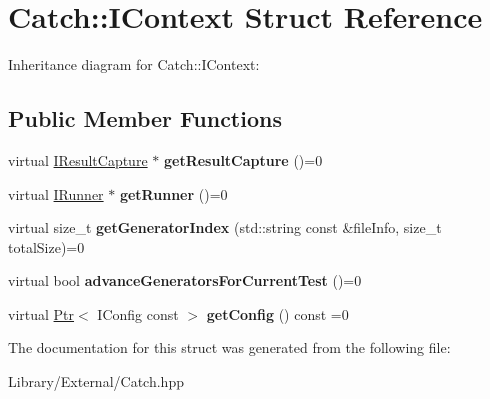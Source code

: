 \hypertarget{struct_catch_1_1_i_context}{}\section{Catch\+:\+:I\+Context Struct Reference}
\label{struct_catch_1_1_i_context}


Inheritance diagram for Catch\+:\+:I\+Context\+:
\subsection*{Public Member Functions}
\begin{DoxyCompactItemize}
\item 
\hypertarget{struct_catch_1_1_i_context_a684e4ae71d1fdf3060c352ecde1d122f}{}virtual \hyperlink{struct_catch_1_1_i_result_capture}{I\+Result\+Capture} $\ast$ {\bfseries get\+Result\+Capture} ()=0\label{struct_catch_1_1_i_context_a684e4ae71d1fdf3060c352ecde1d122f}

\item 
\hypertarget{struct_catch_1_1_i_context_af088415dde18d039ed5a2f95b02767c6}{}virtual \hyperlink{struct_catch_1_1_i_runner}{I\+Runner} $\ast$ {\bfseries get\+Runner} ()=0\label{struct_catch_1_1_i_context_af088415dde18d039ed5a2f95b02767c6}

\item 
\hypertarget{struct_catch_1_1_i_context_a43e07088db43299ba129fbe6d3106e95}{}virtual size\+\_\+t {\bfseries get\+Generator\+Index} (std\+::string const \&file\+Info, size\+\_\+t total\+Size)=0\label{struct_catch_1_1_i_context_a43e07088db43299ba129fbe6d3106e95}

\item 
\hypertarget{struct_catch_1_1_i_context_a806f7c4ed24d51adae90418e661b24b7}{}virtual bool {\bfseries advance\+Generators\+For\+Current\+Test} ()=0\label{struct_catch_1_1_i_context_a806f7c4ed24d51adae90418e661b24b7}

\item 
\hypertarget{struct_catch_1_1_i_context_aee81c415899262e096ad8d6f686fa365}{}virtual \hyperlink{class_catch_1_1_ptr}{Ptr}$<$ I\+Config const  $>$ {\bfseries get\+Config} () const =0\label{struct_catch_1_1_i_context_aee81c415899262e096ad8d6f686fa365}

\end{DoxyCompactItemize}


The documentation for this struct was generated from the following file\+:\begin{DoxyCompactItemize}
\item 
Library/\+External/Catch.\+hpp\end{DoxyCompactItemize}
